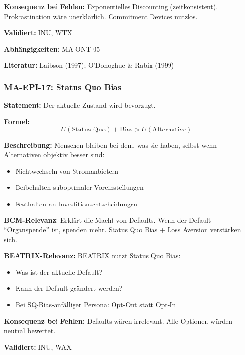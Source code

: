 \textbf{Konsequenz bei Fehlen:}
Exponentielles Discounting (zeitkonsistent). Prokrastination wäre unerklärlich. Commitment Devices nutzlos.

\textbf{Validiert:} INU, WTX

\textbf{Abhängigkeiten:} MA-ONT-05

\textbf{Literatur:} Laibson (1997); O'Donoghue \& Rabin (1999)


\subsubsection*{MA-EPI-17: Status Quo Bias}

\textbf{Statement:} Der aktuelle Zustand wird bevorzugt.

\textbf{Formel:}
\begin{equation}
U(\text{Status Quo}) + \text{Bias} > U(\text{Alternative})
\end{equation}

\textbf{Beschreibung:}
Menschen bleiben bei dem, was sie haben, selbst wenn Alternativen objektiv besser sind:
\begin{itemize}
    \item Nichtwechseln von Stromanbietern
    \item Beibehalten suboptimaler Voreinstellungen
    \item Festhalten an Investitionsentscheidungen
\end{itemize}

\textbf{BCM-Relevanz:}
Erklärt die Macht von Defaults. Wenn der Default ``Organspende'' ist, spenden mehr. Status Quo Bias + Loss Aversion verstärken sich.

\textbf{BEATRIX-Relevanz:}
BEATRIX nutzt Status Quo Bias:
\begin{itemize}
    \item Was ist der aktuelle Default?
    \item Kann der Default geändert werden?
    \item Bei SQ-Bias-anfälliger Persona: Opt-Out statt Opt-In
\end{itemize}

\textbf{Konsequenz bei Fehlen:}
Defaults wären irrelevant. Alle Optionen würden neutral bewertet.

\textbf{Validiert:} INU, WAX

